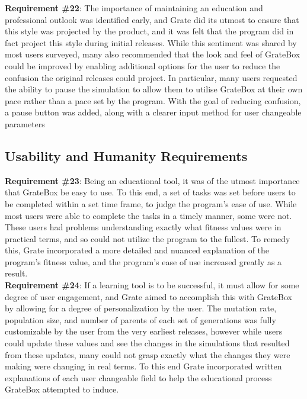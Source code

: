\documentclass[12pt, titlepage]{article}
\begin{document}
\textbf{Requirement \#22}: The importance of maintaining an education and 
professional outlook was identified early, and Grate did its utmost to ensure 
that this style was projected by the product, and it was felt that the program 
did in fact project this style during initial releases. While this sentiment was 
shared by most users surveyed, many also recommended that the look and feel of 
GrateBox could be improved by enabling additional options for the user to reduce 
the confusion the original releases could project. In particular, many users 
requested the ability to pause the simulation to allow them to utilise GrateBox 
at their own pace rather than a pace set by the program. With the goal of 
reducing confusion, a pause button was added, along with a clearer input method 
for user changeable parameters 

\subsection{Usability and Humanity Requirements}

\textbf{Requirement \#23}: Being an educational tool, it was of the utmost 
importance that GrateBox be easy to use. To this end, a set of tasks was set 
before users to be completed within a set time frame, to judge the program's 
ease of use. While most users were able to complete the tasks in a timely 
manner, some were not. These users had problems understanding exactly what 
fitness values were in practical terms, and so could not utilize the program to 
the fullest. To remedy this, Grate incorporated a more detailed and nuanced 
explanation of the program's fitness value, and the program's ease of use 
increased greatly as a result.\\

\textbf{Requirement \#24}: If a learning tool is to be successful, it must allow 
for some degree of user engagement, and Grate aimed to accomplish this with 
GrateBox by allowing for a degree of personalization by the user. The mutation 
rate, population size, and number of parents of each set of generations was 
fully customizable by the user from the very earliest releases, however while 
users could update these values and see the changes in the simulations that 
resulted from these updates, many could not grasp exactly what the changes they 
were making were changing in real terms. To this end Grate incorporated written 
explanations of each user changeable field to help the educational process 
GrateBox attempted to induce.\\
\end{document}
